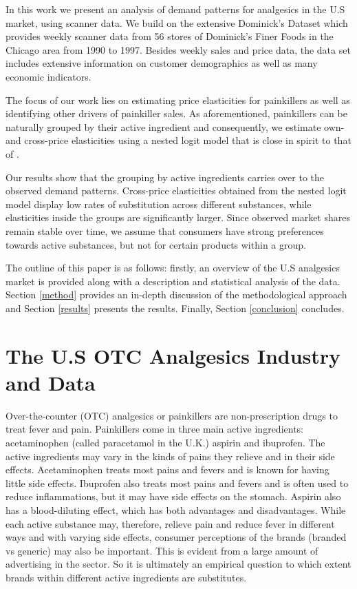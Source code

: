 \documentclass[12pt, authoryear]{elsarticle}
\begin{document}
In this work we present an analysis of demand patterns for analgesics in the U.S market, using scanner data. We build on the extensive Dominick’s Dataset which provides weekly scanner data from 56 stores of Dominick’s Finer Foods in the Chicago area from 1990 to 1997. Besides weekly sales and price data, the data set includes extensive information on customer demographics as well as many economic indicators.

The focus of our work lies on estimating price elasticities for painkillers as well as identifying other drivers of painkiller sales. As aforementioned, painkillers can be naturally grouped by their active ingredient and consequently, we estimate own- and cross-price elasticities using a nested logit model that is close in spirit to that of \cite{berry1994estimating}.

Our results show that the grouping by active ingredients carries over to the observed demand patterns. Cross-price elasticities obtained from the nested logit model display low rates of substitution across different substances, while elasticities inside the groups are significantly larger. Since observed market shares remain stable over time, we assume that consumers have strong preferences towards active substances, but not for certain products within a group. 

The outline of this paper is as follows: firstly, an overview of the U.S analgesics market is provided along with a description and statistical analysis of the data. Section \ref{method}  provides an in-depth discussion of the methodological approach and Section \ref{results} presents the results. Finally, Section \ref{conclusion} concludes.


\section{The U.S OTC Analgesics Industry and Data}\label{data}

Over-the-counter (OTC) analgesics or painkillers are non-prescription drugs to treat fever and pain. Painkillers come in three main active ingredients:  acetaminophen (called paracetamol in the U.K.) aspirin and ibuprofen. The active ingredients may vary in the kinds of pains they relieve and in their side effects. Acetaminophen treats most pains and fevers and is known for having little side effects. Ibuprofen also treats most pains and fevers and is often used to reduce inflammations, but it may have side effects on the stomach. Aspirin also has a blood-diluting effect, which has both advantages and disadvantages. While each active substance may, therefore, relieve pain and reduce fever in different ways and with varying side effects, consumer perceptions of the brands (branded vs generic) may also be important. This is evident from a large amount of advertising in the sector. So it is ultimately an empirical question to which extent brands within different active ingredients are substitutes.
\end{document}
